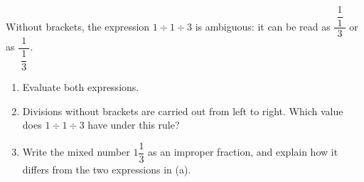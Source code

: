 Without brackets, the expression $1\div1\div3$ is ambiguous: it can be read as $\dfrac{\ \dfrac11\ }{3}$ or as $\dfrac{1}{\ \dfrac13\ }$.
\begin{enumerate}
\item[(a)] Evaluate both expressions.
\item[(b)] Divisions without brackets are carried out from left to right. Which value does $1\div1\div3$ have under this rule?
\item[(c)] Write the mixed number $1\dfrac13$ as an improper fraction, and explain how it differs from the two expressions in (a).
\end{enumerate}
